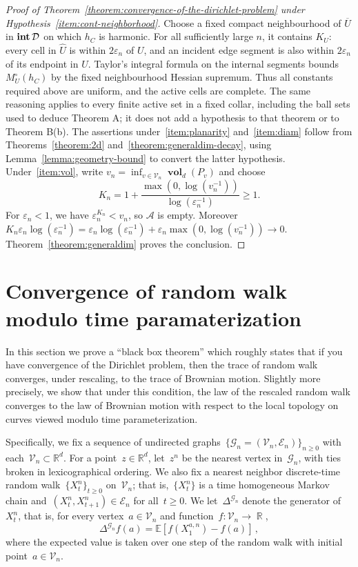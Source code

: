 \documentclass[12pt]{amsart}
\numberwithin{equation}{section}
\DeclareMathOperator{\R}{\mathbb{R}}
\DeclareMathOperator{\intr}{\mathop{\bf int}}
\newcommand*{\Rd}{\ensuremath{\mathbb{R}^d}}
\newcommand{\G}{\mathcal{G}}
\newcommand{\V}{\mathcal{V}}
\newcommand{\E}{\mathcal{E}}
\newcommand{\eps}{\varepsilon}
\DeclareMathOperator{\vol}{\mathbf{vol}}
\begin{document}
\begin{proof}[Proof of Theorem~\ref{theorem:convergence-of-the-dirichlet-problem} under Hypothesis~\ref{item:cont-neighborhood}]
Choose a fixed compact neighbourhood of $\overline U$ in $\intr\mathcal D$ on which $h_C$ is harmonic. For all sufficiently large $n$, it contains $K_U$: every cell in $\widehat U$ is within $2\eps_n$ of $U$, and an incident edge segment is also within $2\eps_n$ of its endpoint in $U$. Taylor's integral formula on the internal segments bounds $M_U^\circ(h_C)$ by the fixed neighbourhood Hessian supremum. Thus all constants required above are uniform, and the active cells are complete. The same reasoning applies to every finite active set in a fixed collar, including the ball sets used to deduce Theorem A; it does not add a hypothesis to that theorem or to Theorem B(b).
The assertions under~\ref{item:planarity} and~\ref{item:diam} follow from Theorems~\ref{theorem:2d} and~\ref{theorem:generaldim-decay}, using Lemma~\ref{lemma:geometry-bound} to convert the latter hypothesis. Under~\ref{item:vol}, write $v_n=\inf_{v\in\V_n}\vol_d(P_v)$ and choose
\[
 K_n=1+\frac{\max(0,\log(v_n^{-1}))}{\log(\eps_n^{-1})}\geq1.
\]
For $\eps_n<1$, we have $\eps_n^{K_n}<v_n$, so $\mathcal A$ is empty. Moreover
$K_n\eps_n\log(\eps_n^{-1})
=\eps_n\log(\eps_n^{-1})+\eps_n\max(0,\log(v_n^{-1}))\to0$.
Theorem~\ref{theorem:generaldim} proves the conclusion.
\end{proof}







\section{Convergence of random walk modulo time paramaterization} 
\label{sec:rw-convergence}
In this section we prove a ``black box theorem'' which roughly states that if you have convergence of the Dirichlet 
problem, then the trace of random walk converges, under rescaling, to the trace of Brownian motion. Slightly more precisely,  we show that under this condition, the law of the rescaled random walk converges to the law of Brownian motion with respect to the local topology on curves viewed modulo time parameterization. 

Specifically, we fix a sequence of undirected graphs~$\{\G_n = (\V_n, \E_n)\}_{n\geq0}$
with each~$\V_n \subset \Rd$.  For a point~$z \in \Rd$, let~$z^{n}$ be the nearest vertex in~$\G_n$, with ties broken in lexicographical ordering.  
We also fix a nearest neighbor discrete-time random walk~$\{X_t^{n}\}_{t \geq 0}$ on~$\V_n$; that is,~$\{X_t^{n}\}$ is a time homogeneous Markov chain and~$(X_{t}^{n}, X_{t+1}^{n}) \in \E_n$ for all~$t \geq 0$. We let~$\Delta^{\G_n}$ denote the generator of~$X_t^{n}$, that is,
for every vertex~$a \in \V_n$ and function~$f: \V_n \to \R$, 
\[
\Delta^{\G_n} f(a) = \mathbb{E}[f(X^{a, n}_1) - f(a)] \, , 
\]
where the expected value is taken over one step of the random walk with initial point~$a \in \V_n$. 
\end{document}
